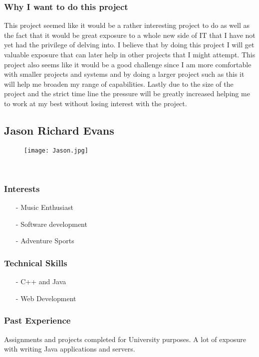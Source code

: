 \subsubsection{Why I want to do this project}
This project seemed like it would be a rather interesting project to do as well as the fact that it would be great exposure to a whole new side of IT that I have not yet had the privilege of delving into. I believe that by doing this project I will get valuable exposure that can later help in other projects that I might attempt. This project also seems like it would be a good challenge since I am more comfortable with smaller projects and systems and by doing a larger project such as this it will help me broaden my range of capabilities. Lastly due to the size of the project and the strict time line the pressure will be greatly increased helping me to work at my best without losing interest with the project. 

\newpage
\subsection{Jason Richard Evans}
\begin{wrapfigure}[5]{l}{0.25\textwidth}
\vspace{10pt}
\texttt{[image: Jason.jpg]}
\end{wrapfigure}

\textcolor{white}{.}
\subsubsection{Interests}
\begin{itemize}
	\item[-]{Music Enthusiast}
	\item[-]{Software development}
	\item[-]{Adventure Sports}
\end{itemize}
\subsubsection{Technical Skills}
\begin{itemize}
	\item[-]{C++ and Java}
	\item[-]{Web Development}
\end{itemize}
\subsubsection{Past Experience}
Assignments and projects completed for University purposes. A lot of exposure with writing Java applications and servers.
